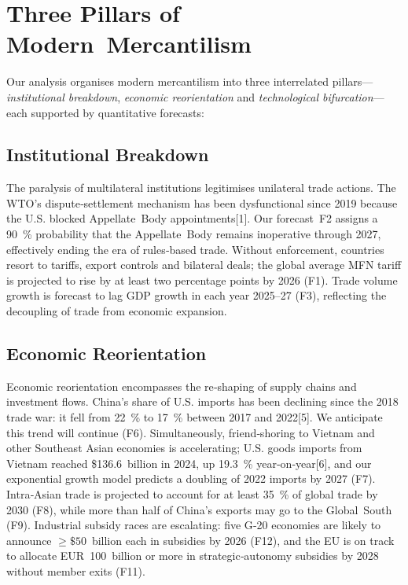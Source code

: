 \documentclass{article}
\begin{document}
\section{Three Pillars of Modern Mercantilism}

Our analysis organises modern mercantilism into three interrelated pillars—\textit{institutional breakdown}, \textit{economic reorientation} and \textit{technological bifurcation}—each supported by quantitative forecasts:

\subsection{Institutional Breakdown}

The paralysis of multilateral institutions legitimises unilateral trade actions.  The WTO’s dispute‑settlement mechanism has been dysfunctional since 2019 because the U.S. blocked Appellate Body appointments[1].  Our forecast F2 assigns a 90 \% probability that the Appellate Body remains inoperative through 2027, effectively ending the era of rules‑based trade.  Without enforcement, countries resort to tariffs, export controls and bilateral deals; the global average MFN tariff is projected to rise by at least two percentage points by 2026 (F1).  Trade volume growth is forecast to lag GDP growth in each year 2025–27 (F3), reflecting the decoupling of trade from economic expansion.

\subsection{Economic Reorientation}

Economic reorientation encompasses the re‑shaping of supply chains and investment flows.  China’s share of U.S. imports has been declining since the 2018 trade war: it fell from 22 \% to 17 \% between 2017 and 2022[5].  We anticipate this trend will continue (F6).  Simultaneously, friend‑shoring to Vietnam and other Southeast Asian economies is accelerating; U.S. goods imports from Vietnam reached \$136.6 billion in 2024, up 19.3 \% year‑on‑year[6], and our exponential growth model predicts a doubling of 2022 imports by 2027 (F7).  Intra‑Asian trade is projected to account for at least 35 \% of global trade by 2030 (F8), while more than half of China’s exports may go to the Global South (F9).  Industrial subsidy races are escalating: five G‑20 economies are likely to announce \(\geq \$50\) billion each in subsidies by 2026 (F12), and the EU is on track to allocate EUR 100 billion or more in strategic‑autonomy subsidies by 2028 without member exits (F11).
\end{document}
